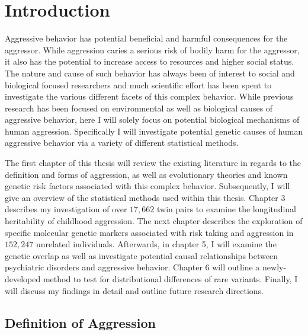 \chapter{Introduction}
\label{cha:introduction}

Aggressive behavior has potential beneficial and harmful consequences for the aggressor.
While aggression caries a serious risk of bodily harm for the aggressor, it also has the potential to increase access to resources and higher social status.
The nature and cause of such behavior has always been of interest to social and biological focused researchers and much scientific effort has been spent to investigate the various different facets of this complex behavior.
While previous research has been focused on environmental as well as biological causes of aggressive behavior, here I will solely focus on potential biological mechanisms of human aggression.
Specifically I will investigate potential genetic causes of human aggressive behavior via a variety of different statistical methods.

The first chapter of this thesis will review the existing literature in regards to the definition and forms of aggression, as well as evolutionary theories and known genetic risk factors associated with this complex behavior.
Subsequently, I will give an overview of the statistical methods used within this thesis.
Chapter 3 describes my investigation of over $17,662$ twin pairs to examine the longitudinal heritability of childhood aggression.
The next chapter describes the exploration of specific molecular genetic markers associated with risk taking and aggression in $152,247$ unrelated individuals.
Afterwards, in chapter 5, I will examine the genetic overlap as well as investigate potential causal relationships between psychiatric disorders and aggressive behavior.
Chapter 6 will outline a newly-developed method to test for distributional differences of rare variants.
Finally, I will discuss my findings in detail and outline future research directions.

\section{Definition of Aggression}
\label{sec:overview_of_reseach_in_aggression}

